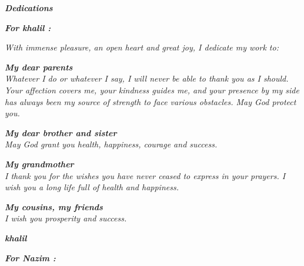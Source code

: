 \begin{center}
    {\Large \textbf{\textit{Dedications}}}
\end{center}

\vspace{1cm}

\begin{center}
    \textbf{\textit{For khalil :}}
\end{center}

\begin{center}
    \textit{With immense pleasure, an open heart and great joy, I dedicate my work to:}
\end{center}

\begin{center}
    \textbf{\textit{My dear parents}} \\
    \textit{Whatever I do or whatever I say, I will never be able to thank you as I should. Your affection covers me, your kindness guides me, and your presence by my side has always been my source of strength to face various obstacles. May God protect you.}
\end{center}

\begin{center}
    \textbf{\textit{My dear brother and sister}} \\
    \textit{May God grant you health, happiness, courage and success.}
\end{center}

\begin{center}
    \textbf{\textit{My grandmother}} \\
    \textit{I thank you for the wishes you have never ceased to express in your prayers. I wish you a long life full of health and happiness.}
\end{center}

\begin{center}
    \textbf{\textit{My cousins, my friends}} \\
    \textit{I wish you prosperity and success.}
\end{center}

\begin{center}
    \textbf{\textit{khalil }}
\end{center}

\vspace{0.5cm}

\begin{center}
    \textbf{\textit{For Nazim :}}
\end{center}

